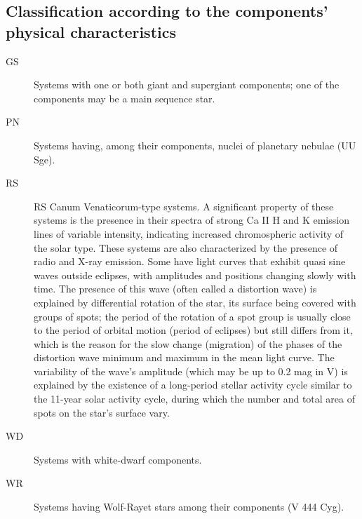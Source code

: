 \subsection{Classification according to the components' physical characteristics}
\begin{description}
    \item[GS]   Systems with one or both giant and supergiant components; one of the components may be a main sequence star.

    \item[PN]   Systems having, among their components, nuclei of planetary nebulae (UU Sge).

    \item[RS]   RS Canum Venaticorum-type systems. A significant property of these systems is the presence in their spectra of strong Ca II H and K emission lines of variable intensity, indicating increased chromospheric activity of the solar type. These systems are also characterized by the presence of radio and X-ray emission. Some have light curves that exhibit quasi sine waves outside eclipses, with amplitudes and positions changing slowly with time. The presence of this wave (often called a distortion wave) is explained by differential rotation of the star, its surface being covered with groups of spots; the period of the rotation of a spot group is usually close to the period of orbital motion (period of eclipses) but still differs from it, which is the reason for the slow change (migration) of the phases of the distortion wave minimum and maximum in the mean light curve. The variability of the wave's amplitude (which may be up to 0.2 mag in V) is explained by the existence of a long-period stellar activity cycle similar to the 11-year solar activity cycle, during which the number and total area of spots on the star's surface vary.

    \item[WD]   Systems with white-dwarf components.

    \item[WR]   Systems having Wolf-Rayet stars among their components (V 444 Cyg).
\end{description}

